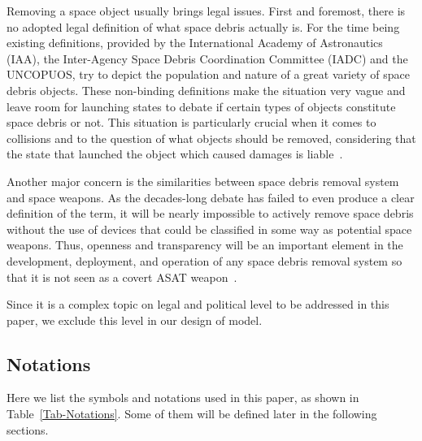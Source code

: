 \documentclass{mcmthesis}
\begin{document}
	Removing a space object usually brings legal issues. First and foremost, there is no adopted legal definition of what space debris actually is. For the time being existing definitions, provided by the International Academy of Astronautics (IAA), the Inter-Agency Space Debris Coordination Committee (IADC) and the UNCOPUOS, try to depict the population and nature of a great variety of space debris objects. These non-binding definitions make the situation very vague and leave room for launching states to debate if certain types of objects constitute space debris or not. This situation is particularly crucial when it comes to collisions and to the question of what	objects should be removed, considering that the	state that launched the object which caused damages is liable~\cite{Lehnert}.
	
	Another major concern is the similarities between space debris removal system and space weapons. As the decades-long debate has failed to even produce a clear definition of the term, it will be nearly impossible to actively remove space debris without the use of devices that could be classified in some way as potential space weapons. Thus, openness and transparency will be an important element in the development, deployment, and operation of any space debris removal system so that it is not seen as a covert ASAT weapon~\cite{Megan}.
	
	Since it is a complex topic on legal and political level to be addressed in this paper, we exclude this level in our design of model.
	
\subsection{Notations}
	Here we list the symbols and notations used in this paper, as shown in Table~\ref{Tab-Notations}. Some of them will be defined later in the following sections.
	
\end{document}
